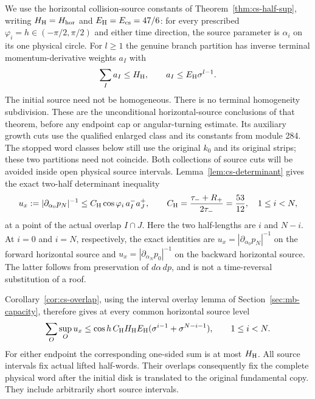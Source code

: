 We use the horizontal collision-source constants of
Theorem~\ref{thm:cs-half-sup}, writing
$H_{\rm H}=H_{\rm hor}$ and $E_{\rm H}=E_{\rm cs}=47/6$: for every prescribed
$\varphi_i=h\in(-\pi/2,\pi/2)$ and either time direction, the
source parameter is $\alpha_i$ on its one physical circle.
For $l\ge1$ the genuine branch partition has inverse terminal
momentum-derivative weights $a_I$ with
\begin{equation}\label{ps:horizontal-input}
 \sum_Ia_I\le H_{\rm H},\qquad
 a_I\le E_{\rm H}\sigma^{l-1}.
\end{equation}
The initial source need not be homogeneous.  There is no terminal
homogeneity subdivision.  These are the unconditional
horizontal-source conclusions of that theorem, before any endpoint cap
or angular-turning estimate.  Its auxiliary growth cuts use the
qualified enlarged class and its constants from module 284.  The
stopped word classes below still use the original $k_0$ and its
original strips; these two partitions need not coincide.  Both
collections of source cuts will be avoided inside open physical
source intervals.  Lemma~\ref{lem:cs-determinant} gives
the exact two-half determinant inequality
\begin{equation}\label{ps:horizontal-product}
 u_x:=|\partial_{\alpha_0}p_N|^{-1}
 \le C_{\rm H}\cos\varphi_i\,a_I^-a_J^+,\qquad
 C_{\rm H}={\tau_-+R_+\over2\tau_-}={53\over12},
 \quad 1\le i<N,
\end{equation}
at a point of the actual overlap $I\cap J$.
Here the two half-lengths are $i$ and $N-i$.
At $i=0$ and $i=N$, respectively, the exact identities are
$u_x=|\partial_{\alpha_0}p_N|^{-1}$ on the forward horizontal source
and $u_x=|\partial_{\alpha_N}p_0|^{-1}$ on the backward horizontal
source.  The latter follows from preservation of
$d\alpha\,dp$, and is not a time-reversal substitution of a roof.

Corollary~\ref{cor:cs-overlap}, using the interval overlay lemma of
Section~\ref{sec:mb-capacity}, therefore gives at every common
horizontal source level
\begin{equation}\label{ps:horizontal-overlay}
 \sum_{O}\sup_Ou_x
 \le \cos h\,C_{\rm H}H_{\rm H}E_{\rm H}
                (\sigma^{i-1}+\sigma^{N-i-1}),
 \qquad 1\le i<N.
\end{equation}
For either endpoint the corresponding one-sided sum is at most
$H_{\rm H}$.  All source intervals fix actual lifted half-words.
Their overlaps consequently fix the complete physical word after
the initial disk is translated to the original fundamental copy.
They include arbitrarily short source intervals.

